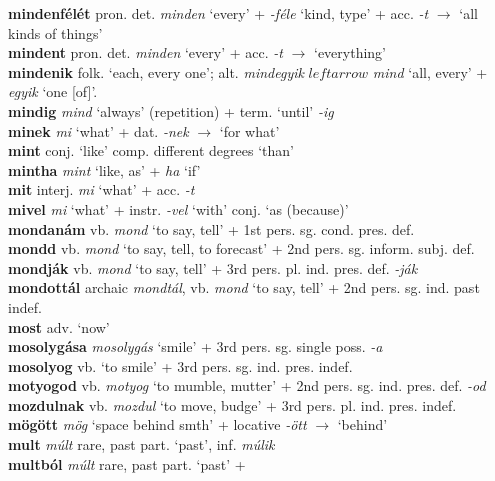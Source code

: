 \documentclass[11pt]{article}
\begin{document}
\textbf{mindenfélét} pron. det. \emph{minden} `every' + \emph{-féle}
`kind, type' + acc. \emph{-t} $\rightarrow$ `all kinds of things' \\
\textbf{mindent} pron. det. \emph{minden} `every' + acc. \emph{-t}
$\rightarrow$ `everything' \\
\textbf{mindenik} folk. `each, every one'; alt. \emph{mindegyik}
  $leftarrow$ \emph{mind} `all, every' + \emph{egyik} `one [of]'. \\
\textbf{mindig} \emph{mind} `always' (repetition) + term. `until'
  \emph{-ig} \\
\textbf{minek} \emph{mi} `what' + dat. \emph{-nek} $\rightarrow$ `for what' \\
\textbf{mint} conj. `like' \textbar\textbar{} comp. different degrees
`than' \\
\textbf{mintha} \emph{mint} `like, as' + \emph{ha} `if' \\
\textbf{mit} interj. \emph{mi} `what' + acc. \emph{-t} \\
\textbf{mivel} \emph{mi} `what' + instr. \emph{-vel}
`with' \textbar\textbar{} conj. `as (because)' \\
\textbf{mondanám} vb. \emph{mond} `to say, tell' + 1st
pers. sg. cond. pres. def. \\
\textbf{mondd} vb. \emph{mond} `to say,
tell, to forecast' + 2nd pers. sg. inform. subj. def. \\
\textbf{mondják} vb. \emph{mond} `to say, tell' + 3rd
pers. pl. ind. pres. def. \emph{-ják} \\
\textbf{mondottál} archaic \emph{mondtál}, vb. \emph{mond} `to say,
tell' + 2nd pers. sg. ind. past indef. \\
\textbf{most} adv. `now' \\
\textbf{mosolygása} \emph{mosolygás} `smile' + 3rd pers. sg. single
poss. \emph{-a} \\
\textbf{mosolyog} vb. `to smile' + 3rd pers. sg. ind. pres. indef. \\
\textbf{motyogod} vb. \emph{motyog} `to mumble, mutter' + 2nd
pers. sg. ind. pres. def. \emph{-od} \\
\textbf{mozdulnak} vb. \emph{mozdul} `to move, budge' + 3rd
pers. pl. ind. pres. indef. \\
\textbf{mögött} \emph{mög} `space behind smth' +  locative \emph{-ött}
$\rightarrow$ `behind' \\
\textbf{mult} \emph{múlt} rare, past part. `past',
inf. \emph{múlik} \\
\textbf{multból} \emph{múlt} rare, past part. `past' +
\end{document}
